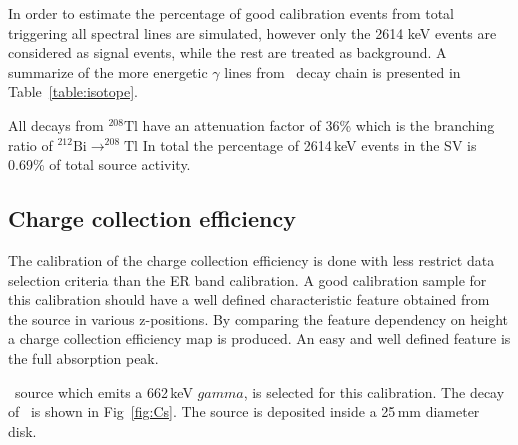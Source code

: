 In order to estimate the percentage of good calibration events from total triggering all spectral lines are simulated, however only the 2614 keV events are considered as signal events, while the rest are treated as background.  
A summarize of the more energetic $\gamma$ lines from \Th\ decay chain is presented in Table~\ref{table:isotope}.
\begin{table}
\begin{center}
\caption{High energy gamma lines from \Th\ decay chain}
\label{table:isotope}
\end{center}
\end{table}

All decays from $^{208}\mathrm{Tl}$ have an attenuation factor of 36\% which is the branching ratio of $^{212}\mathrm{Bi} \rightarrow ^{208}\mathrm{Tl}$
In total the percentage of 2614\,keV events in the SV is 0.69\% of total source activity.

\subsection{Charge collection efficiency}
The calibration of the charge collection efficiency is done with less restrict data selection criteria than the ER band calibration. A good calibration sample for this calibration should have a well defined characteristic feature obtained from the source in various z-positions. By comparing the feature dependency on height a charge collection efficiency map is produced. An easy and well defined feature is the full absorption peak. 

\Cs\ source which emits a 662\,keV $gamma$, is selected for this calibration. The decay of \Cs\ is shown in Fig~\ref{fig:Cs}. The source is deposited inside a 25\,mm diameter disk. 


